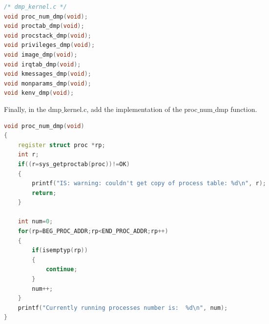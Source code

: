 \documentclass{article}
\begin{document}
\begin{spacing}{2.0}
\begin{lstlisting}[language=c++]
/* dmp_kernel.c */
void proc_num_dmp(void);
void proctab_dmp(void);
void procstack_dmp(void);
void privileges_dmp(void);
void image_dmp(void);
void irqtab_dmp(void);
void kmessages_dmp(void);
void monparams_dmp(void);
void kenv_dmp(void);
\end{lstlisting}
Finally, in the dmp$\_$kernel.c, add the implementation of the proc$\_$num$\_$dmp function.
\begin{lstlisting}[language=c++]
void proc_num_dmp(void)
{
    register struct proc *rp;
    int r;
    if((r=sys_getproctab(proc))!=OK)
    {
        printf("IS: warning: couldn't get copy of process table: %d\n", r);
        return;
    }
    
    int num=0;
    for(rp=BEG_PROC_ADDR;rp<END_PROC_ADDR;rp++)
    {
        if(isemptyp(rp))
        {
            continue;
        }
        num++;
    }
    printf("Currently running processes number is:  %d\n", num);
}
\end{lstlisting}
\end{spacing}
\end{document}
